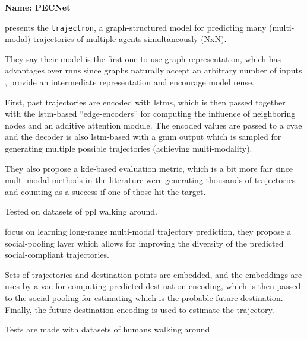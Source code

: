 
\textbf{Name: PECNet}



\cite{ivanovic2019trajectron} presents the \texttt{trajectron}, a graph-structured model for predicting many (multi-modal) trajectories of multiple agents simultaneously (NxN).

They say their model is the first one to use graph representation, which has advantages over \glspl{rnn} since graphs naturally accept an arbitrary number of inputs , provide an intermediate representation and encourage model reuse.

First, past trajectories are encoded with \glspl{lstm}, which is then passed together with the \gls{lstm}-based ``edge-encoders'' for computing the influence of neighboring nodes and an additive attention module. 
%
The encoded values are passed to a \gls{cvae} and the decoder is also \gls{lstm}-based with a \gls{gmm} output which is sampled for generating multiple possible trajectories (achieving multi-modality).

They also propose a \gls{kde}-based evaluation metric, which is a bit more fair since multi-modal methods in the literature were generating thousands of trajectories and counting as a success if one of those hit the target.

Tested on datasets of ppl walking around.

\cite{mangalam2020not} focus on learning long-range multi-modal trajectory prediction, they propose a social-pooling layer which allows for improving the diversity of the predicted social-compliant trajectories.

Sets of trajectories and destination points are embedded, and the embeddings are uses by a \gls{vae} for computing predicted destination encoding, which is then passed to the social pooling for estimating which is the probable future destination.
%
Finally, the future destination encoding is used to estimate the trajectory.
%

Tests are made with datasets of humans walking around.


